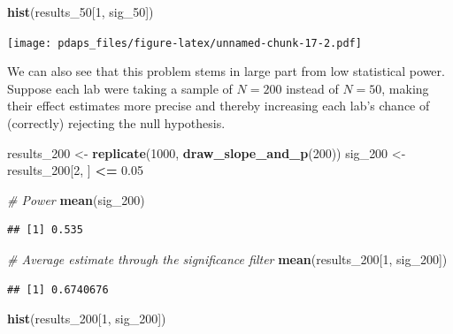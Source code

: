\documentclass[
  12pt,
  oneside,openany]{book}
\newenvironment{Shaded}{\begin{snugshade}}{\end{snugshade}}
\newcommand{\CommentTok}[1]{\textcolor[rgb]{0.56,0.35,0.01}{\textit{#1}}}
\newcommand{\DecValTok}[1]{\textcolor[rgb]{0.00,0.00,0.81}{#1}}
\newcommand{\FloatTok}[1]{\textcolor[rgb]{0.00,0.00,0.81}{#1}}
\newcommand{\KeywordTok}[1]{\textcolor[rgb]{0.13,0.29,0.53}{\textbf{#1}}}
\newcommand{\NormalTok}[1]{#1}
\newcommand{\OperatorTok}[1]{\textcolor[rgb]{0.81,0.36,0.00}{\textbf{#1}}}
\newcommand{\StringTok}[1]{\textcolor[rgb]{0.31,0.60,0.02}{#1}}
\begin{document}
\begin{Shaded}
\begin{Highlighting}[]
\KeywordTok{hist}\NormalTok{(results\_}\DecValTok{50}\NormalTok{[}\DecValTok{1}\NormalTok{, sig\_}\DecValTok{50}\NormalTok{])}
\end{Highlighting}
\end{Shaded}

\texttt{[image: pdaps\_files/figure-latex/unnamed-chunk-17-2.pdf]}

We can also see that this problem stems in large part from low statistical power. Suppose each lab were taking a sample of \(N = 200\) instead of \(N = 50\), making their effect estimates more precise and thereby increasing each lab's chance of (correctly) rejecting the null hypothesis.

\begin{Shaded}
\begin{Highlighting}[]
\NormalTok{results\_}\DecValTok{200}\NormalTok{ <{-}}\StringTok{ }\KeywordTok{replicate}\NormalTok{(}\DecValTok{1000}\NormalTok{, }\KeywordTok{draw\_slope\_and\_p}\NormalTok{(}\DecValTok{200}\NormalTok{))}
\NormalTok{sig\_}\DecValTok{200}\NormalTok{ <{-}}\StringTok{ }\NormalTok{results\_}\DecValTok{200}\NormalTok{[}\DecValTok{2}\NormalTok{, ] }\OperatorTok{<=}\StringTok{ }\FloatTok{0.05}

\CommentTok{\# Power}
\KeywordTok{mean}\NormalTok{(sig\_}\DecValTok{200}\NormalTok{)}
\end{Highlighting}
\end{Shaded}

\begin{verbatim}
## [1] 0.535
\end{verbatim}

\begin{Shaded}
\begin{Highlighting}[]
\CommentTok{\# Average estimate through the significance filter}
\KeywordTok{mean}\NormalTok{(results\_}\DecValTok{200}\NormalTok{[}\DecValTok{1}\NormalTok{, sig\_}\DecValTok{200}\NormalTok{])}
\end{Highlighting}
\end{Shaded}

\begin{verbatim}
## [1] 0.6740676
\end{verbatim}

\begin{Shaded}
\begin{Highlighting}[]
\KeywordTok{hist}\NormalTok{(results\_}\DecValTok{200}\NormalTok{[}\DecValTok{1}\NormalTok{, sig\_}\DecValTok{200}\NormalTok{])}
\end{Highlighting}
\end{Shaded}
\end{document}
